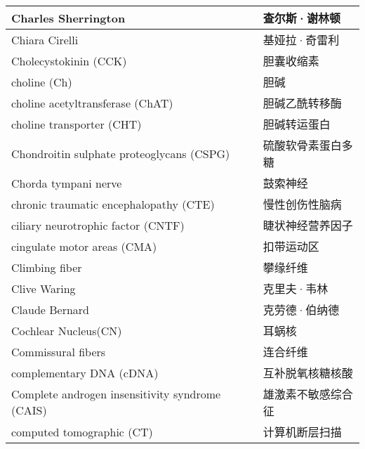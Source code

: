 \begin{longtable}{lll}
	\midrule
	Charles Sherrington   && 查尔斯·谢林顿  \\
	
	\midrule
	Chiara Cirelli   && 基娅拉·奇雷利  \\
	
	\midrule
	Cholecystokinin (CCK)   && 胆囊收缩素  \\
	
	\midrule
	choline (Ch)   && 胆碱  \\
	
	\midrule
	choline acetyltransferase (ChAT)   && 胆碱乙酰转移酶  \\
	
	\midrule
	choline transporter (CHT)   && 胆碱转运蛋白  \\
	
	\midrule
	Chondroitin sulphate proteoglycans (CSPG) && 硫酸软骨素蛋白多糖  \\
	
	\midrule
	Chorda tympani nerve   && 鼓索神经  \\
	
	\midrule
	chronic traumatic encephalopathy (CTE)   && 慢性创伤性脑病  \\
	
	\midrule
	ciliary neurotrophic factor (CNTF)  && 睫状神经营养因子  \\
	
	\midrule
	cingulate motor areas (CMA)   && 扣带运动区  \\
	
	\midrule
	Climbing fiber   && 攀缘纤维  \\
	
	\midrule
	Clive Waring   && 克里夫·韦林  \\
	
	\midrule
	Claude Bernard   && 克劳德·伯纳德  \\
	
	\midrule
	Cochlear Nucleus(CN)   && 耳蜗核  \\
	
	\midrule
	Commissural fibers   && 连合纤维  \\
	
	\midrule
	complementary DNA (cDNA)   && 互补脱氧核糖核酸  \\
	
	\midrule
	Complete androgen insensitivity syndrome (CAIS)  && 雄激素不敏感综合征  \\
	
	\midrule
	computed tomographic (CT)   && 计算机断层扫描  \\
	

\end{longtable}
